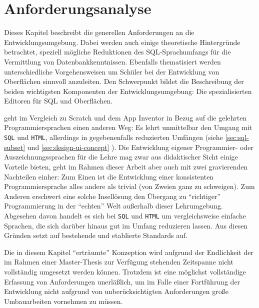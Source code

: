 \section{Anforderungsanalyse}
\label{sec:requirements}

Dieses Kapitel beschreibt die generellen Anforderungen an die Entwicklungsumgebung. Dabei werden auch einige theoretische Hintergründe betrachtet, speziell mögliche Reduktionen des SQL-Sprachumfangs für die Vermittlung von Datenbankkenntnissen. Ebenfalls thematisiert werden unterschiedliche Vorgehensweisen um Schüler bei der Entwicklung von Oberflächen sinnvoll anzuleiten. Den Schwerpunkt bildet die Beschreibung der beiden wichtigsten Komponenten der Entwicklungsumgebung: Die spezialisierten Editoren für SQL und Oberflächen.


\idename{} geht im Vergleich zu Scratch und dem App Inventor in Bezug auf die gelehrten Programmiersprachen einen anderen Weg: Es lehrt unmittelbar den Umgang mit \texttt{SQL} und \texttt{HTML}, allerdings in gegebenenfalls reduzierten Umfängen (siehe \ref{sec:sql-subset}  und \ref{sec:design-ui-concept} ). Die Entwicklung eigener Programmier- oder Auszeichnungssprachen für die Lehre mag zwar aus didaktischer Sicht einige Vorteile bieten, geht im Rahmen dieser Arbeit aber auch mit zwei gravierenden Nachteilen einher: Zum Einen ist die Entwicklung einer konsistenten Programmiersprache alles andere als trivial (von Zweien ganz zu schweigen). Zum Anderen erschwert eine solche Insellösung den Übergang zu "`richtiger"' Programmierung in der "`echten"' Welt außerhalb dieser Lehrumgebung. Abgesehen davon handelt es sich bei \texttt{SQL} und \texttt{HTML} um vergleichsweise einfache Sprachen, die sich darüber hinaus gut im Umfang reduzieren lassen. Aus diesen Gründen setzt \idename{} auf bestehende und etablierte Standards auf.

Die in diesem Kapitel "`erträumte"' Konzeption wird aufgrund der Endlichkeit der im Rahmen einer Master-Thesis zur Verfügung stehenden Zeitspanne nicht vollständig umgesetzt werden können. Trotzdem ist eine möglichst vollständige Erfassung von Anforderungen unerläßlich, um im Falle einer Fortführung der Entwicklung nicht aufgrund von unberücksichtigten Anforderungen große Umbauarbeiten vornehmen zu müssen.

